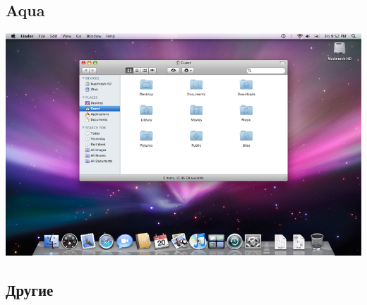 \subsection{Aqua}\label{base:software:de:aqua}
\includegraphics[scale=0.4]{base/Software/Aqua}
\subsection{Другие}\label{base:software:de:others}
